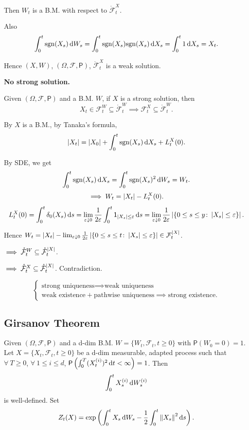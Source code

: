 {    Then $W_t$ is a B.M. with respect to $\mathring{\mathcal{F}}_t^X$. 

    Also 
    $$
        \int_0^t \mathrm{sgn}(X_s) \mathop{}\!\mathrm{d} W_s = \int_0^t \mathrm{sgn}(X_s) \mathrm{sgn}(X_s)\mathop{}\!\mathrm{d} X_s = \int_0^t 1 \mathop{}\!\mathrm{d} X_s = X_t.
    $$

    Hence $(X,W)$, $(\Omega,\mathcal{F},\mathsf{P})$, $\mathring{\mathcal{F}}_t^X$ is a weak solution.

    \textbf{No strong solution.}

    Given $(\Omega, \mathcal{F}, \mathsf{P})$ and a B.M. $W$, if $X$ is a strong solution, then 
    $$
    X_t \in \mathcal{F}_t^{W} \subseteq \mathring{\mathcal{F}}_t^W \implies \mathcal{F}_t^X \subseteq \mathring{\mathcal{F}}_t^W.
    $$

    By $X$ is a B.M., by Tanaka's formula,
    $$
    \left|  X_t  \right|= \left|  X_0  \right| + \int_0^t \mathrm{sgn}(X_s) \mathop{}\!\mathrm{d} X_s + L_t^X(0).
    $$

    By SDE, we get
    $$
    \int_0^t \mathrm{sgn}(X_s) \mathop{}\!\mathrm{d} X_s = \int_0^t \mathrm{sgn}(X_s)^2 \mathop{}\!\mathrm{d} W_s = W_t.
    $$  
    $$
    \implies W_t = \left|  X_t  \right|  - L_t^X(0).
    $$
    $$
    L_t^X(0) = \int_0^t \delta_0 (X_s) \mathop{}\!\mathrm{d} s = \lim_{\varepsilon \downarrow 0} \frac{1}{2\varepsilon} \int_0^t \mathsf{1}_{\left|  X_s  \right| \leq \varepsilon} \mathop{}\!\mathrm{d} s = \lim_{\varepsilon \downarrow 0} \frac{1}{2\varepsilon} \left|  \{0 \leq s \leq y \colon \left|  X_s  \right| \leq \varepsilon\}  \right|.
    $$

    Hence $W_t = \left|  X_t  \right| - \lim_{\varepsilon \downarrow 0} \frac{1}{2 \varepsilon} \left|  \{0 \leq s \leq t \colon \left|  X_s  \right| \leq \varepsilon\}  \right| \in \mathcal{F}_t^{\left|  X  \right|}$.

    $\implies \mathring{\mathcal{F}}_t^W \subseteq \mathring{\mathcal{F}}_t^{\left|  X  \right|}$.

    $\implies \mathring{\mathcal{F}}_t^X \subseteq \mathring{\mathcal{F}}_t^{\left|  X  \right|}$. Contradiction.
}

$$
\begin{cases}
    \text{strong uniqueness} \implies \text{weak uniqueness}\\
    \text{weak existence}+\text{pathwise uniqueness} \implies \text{strong existence}.
\end{cases}
$$

\subsection{Girsanov Theorem}
    Given $(\Omega, \mathcal{F},\mathsf{P})$ and a d-dim B.M. $W=\{W_t,\mathcal{F}_t, t \geq 0\}$ with $\mathsf{P}(W_0 = 0) = 1$. Let $X=\{X_t,\mathcal{F}_t,t \geq 0\}$ be a d-dim measurable, adapted process such that $\forall~ T \geq 0$, $\forall~ 1 \leq i \leq d$, $\mathsf{P}\left( \int_0^T (X_t^{(i)})^2 \mathop{}\!\mathrm{d} t < \infty \right) = 1$. Then 
    $$
    \int_0^t X_s^{(i)} \mathop{}\!\mathrm{d} W_s^{(i)}
    $$
    is well-defined. Set 
    $$
    Z_t(X) = \exp \left( \int_0^t X_s \mathop{}\!\mathrm{d} W_s  - \frac{1}{2}\int_0^t \left\|  X_s  \right\|^2 \mathop{}\!\mathrm{d} s \right).
    $$


